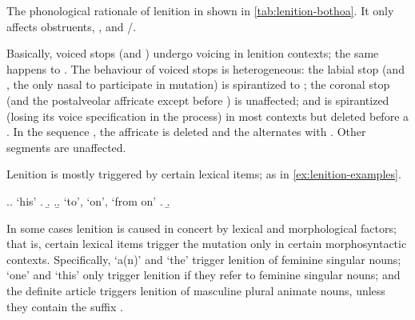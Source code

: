 The phonological rationale of lenition in shown in \cref{tab:lenition-bothoa}. It only affects obstruents, \ipa{[m]}, and \ipa{[hr]}/\ipa{[r̥]}.
\begin{table}[tbp]
  \centering
{}
  \caption{Lenition in Bothoa Breton}
  \label{tab:lenition-bothoa}
\end{table}

Basically, voiced stops (and \ipa{[ʧ]}) undergo voicing in lenition contexts; the same happens to \ipa{[r̥]}. The behaviour of voiced stops is heterogeneous: the labial stop (and \ipa{[m]}, the only nasal to participate in mutation) is spirantized to \ipa{[v]}; the coronal stop (and the postalveolar affricate except before \ipa{[ɥ]}) is unaffected; and \ipa{[ɡ]} is spirantized (losing its voice specification in the process) in most contexts but deleted before a \ipa{[w]}. In the sequence \ipa{[dʒɥ]}, the affricate is deleted and the \ipa{[ɥ]} alternates with \ipa{[v]}. Other segments are unaffected.

Lenition is mostly triggered by certain lexical items; as in \cref{ex:lenition-examples}.

\ex.\label{ex:lenition-examples}\a.\ipa{[i]} `his'
\a.
\b.
\z.\b.\ipa{[də]} `to', \ipa{[wa]} `on', \ipa{[diwa]} `from on'
\a.
\b.


In some cases lenition is caused in concert by lexical and morphological factors; that is, certain lexical items trigger the mutation only in certain morphosyntactic contexts. Specifically, \ipa{[o(n)]} `a(n)' and \ipa{[ə(n)]} `the' trigger lenition of feminine singular nouns; \ipa{[oˈnõn]} `one' and \ipa{[hãj̃\kern-1pt]} `this' only trigger lenition if they refer to feminine singular nouns; and the definite article \ipa{[ə(n)]} triggers lenition of masculine plural animate nouns, unless they contain the suffix .

